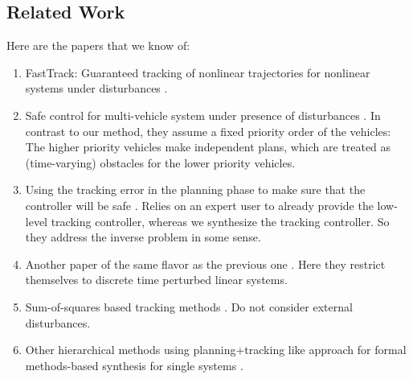\subsection{Related Work}

Here are the papers that we know of:
\begin{enumerate}
	\item FastTrack: Guaranteed tracking of nonlinear trajectories for nonlinear systems under disturbances \cite{herbert2017fastrack}. 
	\item Safe control for multi-vehicle system under presence of disturbances \cite{bansal2017safe}. In contrast to our method, they assume a fixed priority order of the vehicles: The higher priority vehicles make independent plans, which are treated as (time-varying) obstacles for the lower priority vehicles. 
	\item Using the tracking error in the planning phase to make sure that the controller will be safe \cite{fan2020fast}. Relies on an expert user to already provide the low-level tracking controller, whereas we synthesize the tracking controller. So they address the inverse problem in some sense.
	\item Another paper of the same flavor as the previous one \cite{fan2018controller}. Here they restrict themselves to discrete time perturbed linear systems.
	\item Sum-of-squares based tracking methods \cite{tedrake2010lqr, singh2018robust}. Do not consider external disturbances.
	\item Other hierarchical methods using planning+tracking like approach for formal methods-based synthesis for single systems \cite{wongpiromsarn2012receding, DBLP:journals/tac/MeyerD19, DBLP:journals/corr/abs-1911-09773}.

\end{enumerate}
